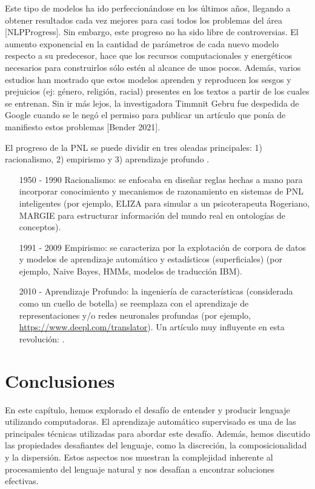 \documentclass{book}
\begin{document}
Este tipo de modelos ha ido perfeccionándose en los últimos años, llegando a obtener resultados cada vez mejores para casi todos los problemas del área [NLPProgress]. Sin embargo, este progreso no ha sido libre de controversias. El  aumento exponencial en la cantidad de parámetros de cada nuevo modelo respecto a su predecesor, hace que los recursos computacionales y energéticos necesarios para construirlos sólo estén al alcance de unos pocos. Además, varios estudios han mostrado que estos modelos aprenden y reproducen los sesgos y prejuicios (ej: género, religión, racial) presentes en los textos a partir de los cuales se entrenan. Sin ir más lejos, la investigadora  Timmnit Gebru fue despedida de Google  cuando se le negó el permiso para publicar un artículo que ponía de manifiesto estos problemas [Bender 2021].


El progreso de la PNL se puede dividir en tres oleadas principales: 1) racionalismo, 2) empirismo y 3) aprendizaje profundo \cite{deng2018deep}.
\begin{itemize}
   \item [1950 - 1990] Racionalismo: se enfocaba en diseñar reglas hechas a mano para incorporar conocimiento y mecanismos de razonamiento en sistemas de PNL inteligentes (por ejemplo, ELIZA para simular a un psicoterapeuta Rogeriano, MARGIE para estructurar información del mundo real en ontologías de conceptos).
   \item [1991 - 2009] Empirismo: se caracteriza por la explotación de corpora de datos y modelos de aprendizaje automático y estadísticos (superficiales) (por ejemplo, Naive Bayes, HMMs, modelos de traducción IBM).
   \item [2010 - ] Aprendizaje Profundo: la ingeniería de características (considerada como un cuello de botella) se reemplaza con el aprendizaje de representaciones y/o redes neuronales profundas (por ejemplo, \url{https://www.deepl.com/translator}). Un artículo muy influyente en esta revolución: \cite{collobert2011natural}.
\end{itemize}


\section{Conclusiones}


En este capítulo, hemos explorado el desafío de entender y producir lenguaje utilizando computadoras. El aprendizaje automático supervisado es una de las principales técnicas utilizadas para abordar este desafío. Además, hemos discutido las propiedades desafiantes del lenguaje, como la discreción, la composicionalidad y la dispersión. Estos aspectos nos muestran la complejidad inherente al procesamiento del lenguaje natural y nos desafían a encontrar soluciones efectivas.
\end{document}
